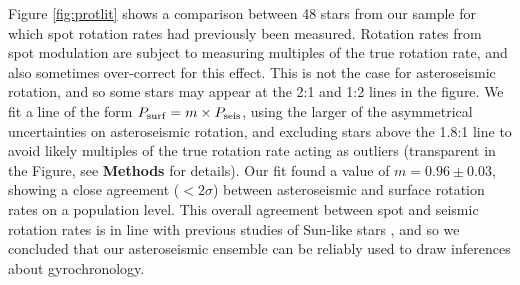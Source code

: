 \documentclass[12pt]{article}
\begin{document}
Figure \ref{fig:protlit} shows a comparison between 48 stars from our sample for which spot  rotation rates had previously been measured. Rotation rates from spot modulation are subject to measuring multiples of the true rotation rate, and also sometimes over-correct for this effect. This is not the case for asteroseismic rotation, and so some stars may appear at the 2:1 and 1:2 lines in the figure. We fit a line of the form $P_{\rm surf} = m \times P_{\rm seis}$, using the larger of the asymmetrical uncertainties on asteroseismic rotation, and excluding stars above the 1.8:1 line to avoid likely multiples of the true rotation rate acting as outliers (transparent in the Figure, see \textbf{Methods} for details). Our fit found a value of $m = 0.96 \pm 0.03$, showing a close agreement ($<2\sigma$) between asteroseismic and surface rotation rates on a population level. This overall agreement between spot and seismic rotation rates is in line with previous studies of Sun-like stars \cite{nielsen+2015, benomar+2015, gizon+2013, chaplin+2013}, and so we concluded that our asteroseismic ensemble can be reliably used to draw inferences about gyrochronology.\\
\end{document}
